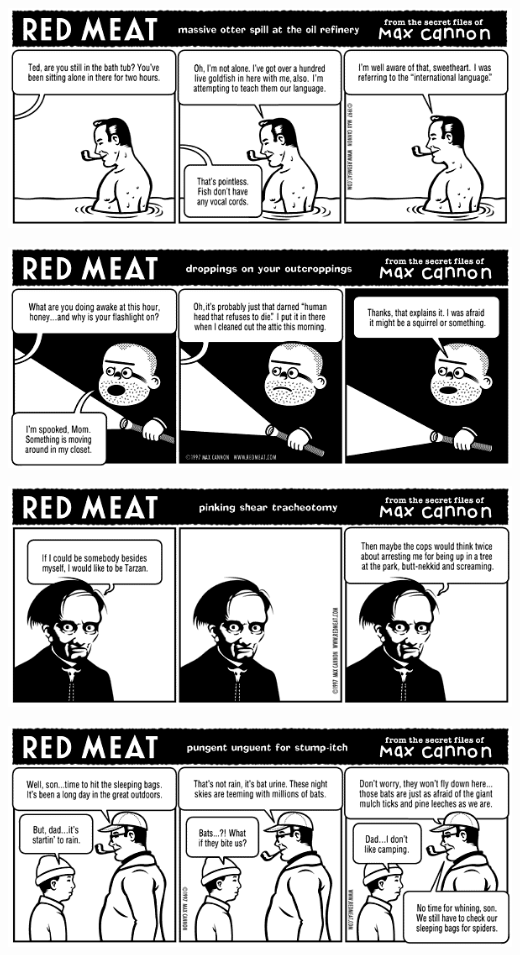 \documentclass[a4paper,twoside,11pt]{article}
\begin{document}
\includegraphics[width=\textwidth]{redmeat_1998-01-19.png}



\includegraphics[width=\textwidth]{redmeat_1998-01-26.png}



\includegraphics[width=\textwidth]{redmeat_1998-02-02.png}



\includegraphics[width=\textwidth]{redmeat_1998-02-09.png}
\end{document}

